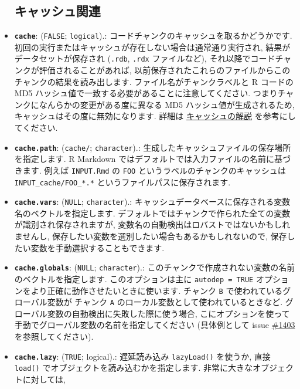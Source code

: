 \documentclass[
]{bxjsreport}
\begin{document}
\begin{itemize}
{  \subsection{キャッシュ関連}\label{options-cache}}
\item
  \textbf{\texttt{cache}}: (\texttt{FALSE}; \texttt{logical}).:
  コードチャンクのキャッシュを取るかどうかです.
  初回の実行またはキャッシュが存在しない場合は通常通り実行され,
  結果がデータセットが保存され (\texttt{.rdb}, \texttt{.rdx}
  ファイルなど), それ以降でコードチャンクが評価されることがあれば,
  以前保存されたこれらのファイルからこのチャンクの結果を読み出します.
  ファイル名がチャンクラベルと R コードの MD5
  ハッシュ値で一致する必要があることに注意してください.
  つまりチャンクになんらかの変更がある度に異なる MD5
  ハッシュ値が生成されるため, キャッシュはその度に無効になります. 詳細は
  \protect\hyperlink{cache}{キャッシュの解説} を参考にしてください.
\item
  \textbf{\texttt{cache.path}}:
  (\texttt{\textquotesingle{}cache/\textquotesingle{}};
  \texttt{character}).:
  生成したキャッシュファイルの保存場所を指定します. R Markdown
  ではデフォルトでは入力ファイルの名前に基づきます. 例えば
  \texttt{INPUT.Rmd} の \texttt{FOO}
  というラベルのチャンクのキャッシュは \texttt{INPUT\_cache/FOO\_*.*}
  というファイルパスに保存されます.
\item
  \textbf{\texttt{cache.vars}}: (\texttt{NULL}; \texttt{character}).:
  キャッシュデータベースに保存される変数名のベクトルを指定します.
  デフォルトではチャンクで作られた全ての変数が識別され保存されますが,
  変数名の自動検出はロバストではないかもしれませんし,
  保存したい変数を選別したい場合もあるかもしれないので,
  保存したい変数を手動選択することもできます.
\item
  \textbf{\texttt{cache.globals}}: (\texttt{NULL}; \texttt{character}).:
  このチャンクで作成されない変数の名前のベクトルを指定します.
  このオプションは主に \texttt{autodep\ =\ TRUE}
  オプションをより正確に動作させたいときに使います. チャンク \texttt{B}
  で使われているグローバル変数が チャンク \texttt{A}
  のローカル変数として使われているときなど.
  グローバル変数の自動検出に失敗した際に使う場合,
  こにオプションを使って手動でグローバル変数の名前を指定してください
  (具体例として issue
  \href{https://github.com/yihui/knitr/issues/1403}{\#1403}
  を参照してください).
\item
  \textbf{\texttt{cache.lazy}}: (\texttt{TRUE}; logical).: 遅延読み込み
  \texttt{lazyLoad()} を使うか, 直接 \texttt{load()}
  でオブジェクトを読み込むかを指定します.
  非常に大きなオブジェクトに対しては,

\end{itemize}
\end{document}
